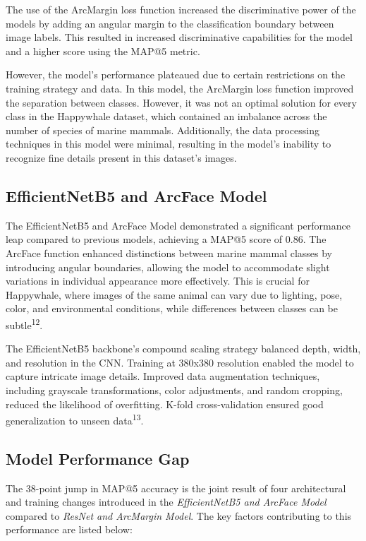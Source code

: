 \documentclass[twocolumn]{article}
\begin{document}
The use of the ArcMargin loss function increased the discriminative power of the models by adding an angular margin to the classification boundary between image labels. This resulted in increased discriminative capabilities for the model and a higher score using the MAP@5 metric.

However, the model's performance plateaued due to certain restrictions on the training strategy and data. In this model, the ArcMargin loss function improved the separation between classes. However, it was not an optimal solution for every class in the Happywhale dataset, which contained an imbalance across the number of species of marine mammals. Additionally, the data processing techniques in this model were minimal, resulting in the model's inability to recognize fine details present in this dataset's images.

\subsection{EfficientNetB5 and ArcFace Model}
The EfficientNetB5 and ArcFace Model demonstrated a significant performance leap compared to previous models, achieving a MAP@5 score of 0.86. The ArcFace function enhanced distinctions between marine mammal classes by introducing angular boundaries, allowing the model to accommodate slight variations in individual appearance more effectively. This is crucial for Happywhale, where images of the same animal can vary due to lighting, pose, color, and environmental conditions, while differences between classes can be subtle\textsuperscript{12}.

The EfficientNetB5 backbone's compound scaling strategy balanced depth, width, and resolution in the CNN. Training at 380x380 resolution enabled the model to capture intricate image details. Improved data augmentation techniques, including grayscale transformations, color adjustments, and random cropping, reduced the likelihood of overfitting. K-fold cross-validation ensured good generalization to unseen data\textsuperscript{13}.

\subsection{Model Performance Gap}

The 38-point jump in MAP@5 accuracy is the joint result of four architectural and training changes introduced in the \textit{EfficientNetB5 and ArcFace Model} compared to \textit{ResNet and ArcMargin Model}. The key factors contributing to this performance are listed below:
\end{document}
